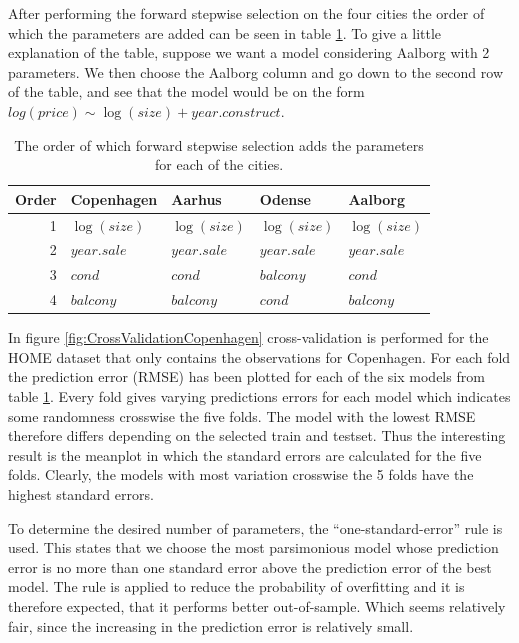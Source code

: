 After performing the forward stepwise selection on the four cities the order of which the parameters are added can be seen in table \ref{tbl:order_of_parameters}.
To give a little explanation of the table, suppose we want a model considering Aalborg with 2 parameters.
We then choose the Aalborg column and go down to the second row of the table, and see that the model would be on the form $log(price) \sim \log(size) + year.construct$.
\begin{table}[H]
    \centering
    \begin{tabular}{r|llll}
        \toprule
        \textbf{Order} & \textbf{Copenhagen} & \textbf{Aarhus} & \textbf{Odense} & \textbf{Aalborg}\\
        \midrule
        1 & $\log(size)$        & $\log(size)$      & $\log(size)$      & $\log(size)$ \\
        2 & $year.sale$         & $year.sale$       & $year.sale$       & $year.sale$ \\
        3 & $cond$    & $cond$  & $balcony$  & $cond$ \\
        4 & $balcony$           & $balcony$            & $cond$         & $balcony$ \\
        \bottomrule
    \end{tabular}
    \caption{The order of which forward stepwise selection adds the parameters for each of the cities.}
    \label{tbl:order_of_parameters}
\end{table}

In figure \ref{fig:CrossValidationCopenhagen} cross-validation is performed for the HOME dataset that only contains the observations for Copenhagen.
For each fold the prediction error (RMSE) has been plotted for each of the six models from table \ref{tbl:order_of_parameters}. Every fold gives varying predictions errors for each model which indicates some randomness crosswise the five folds. The model with the lowest RMSE therefore differs depending on the selected train and testset. 
Thus the interesting result is the meanplot in which the standard errors are calculated for the five folds.
Clearly, the models with most variation crosswise the 5 folds have the highest standard errors. 

To determine the desired number of parameters, the ``one-standard-error'' rule is used. 
This states that we choose the most parsimonious model whose prediction error is no more than one standard error above the prediction error of the best model. The rule is applied to reduce the probability of overfitting and it is therefore expected, that it performs better out-of-sample. Which seems relatively fair, since the increasing in the prediction error is relatively small.

